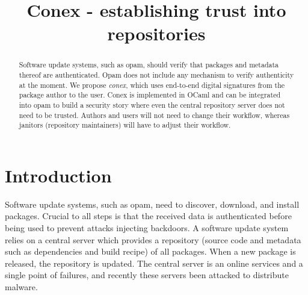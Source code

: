 \documentclass[nocopyrightspace]{sigplanconf}
\begin{document}
\setlength{\pdfpageheight}{\paperheight}
\setlength{\pdfpagewidth}{\paperwidth}

\title{Conex - establishing trust into repositories}


\date{}

\maketitle

\begin{abstract}
  Software update systems, such as opam, should verify that packages and metadata thereof are authenticated.
  Opam does not include any mechanism to verify authenticity at the moment.
  We propose \emph{conex}, which uses end-to-end digital signatures from the package author to the user.
  Conex is implemented in OCaml and can be integrated into opam to build a security story where even the central repository server does not need to be trusted.
  Authors and users will not need to change their workflow, whereas janitors (repository maintainers) will have to adjust their workflow.
\end{abstract}

\section{Introduction}
Software update systems, such as opam, need to discover, download, and install packages.
Crucial to all steps is that the received data is authenticated before being used to prevent attacks injecting backdoors.
A software update system relies on a central server which provides a repository (source code and metadata such as dependencies and build recipe) of all packages.
When a new package is released, the repository is updated.
The central server is an online services and a single point of failures, and recently these servers been attacked \cite{adobe,apache2,apache1,opera,kernel,cabal,kernelorg,debian,freebsd,php3,savannah,maven,savannah2,npm,php,phpmyadmin,php2,github,ocamlforge,redhatssh,gentoo,rubygems,fedora,wordpress} to distribute malware.
\end{document}
